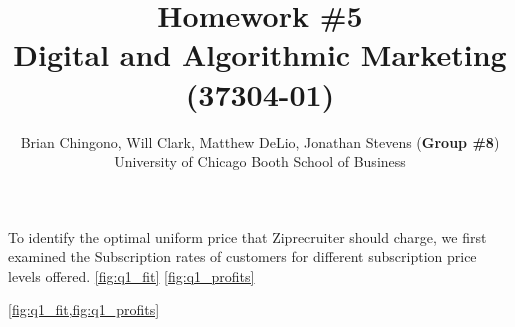 



\title{Homework \#5\\
Digital and Algorithmic Marketing (37304-01)}
\author{
Brian Chingono, Will Clark, Matthew DeLio, Jonathan Stevens (\textbf{Group \#8})\\
University of Chicago Booth School of Business}

\maketitle

\section{} %

To identify the optimal uniform price that Ziprecruiter should charge, we first examined the Subscription rates of customers for different subscription price levels offered.   
\vref{fig:q1_fit} \vref{fig:q1_profits} 

\vref{fig:q1_fit,fig:q1_profits}




\section{} %




\section{} %



% 


